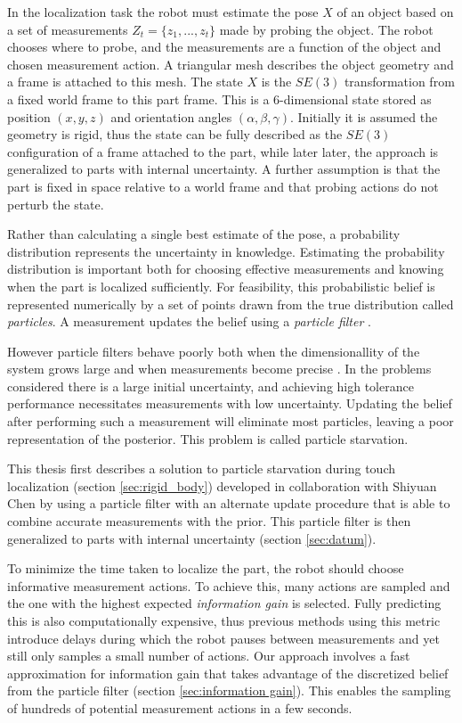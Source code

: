\documentclass[../thesis.tex]{subfiles}
\begin{document}
In the localization task the robot must estimate the pose $X$ of an object based on a set of measurements $Z_t = \{z_1, ..., z_t\}$ made by probing the object.
The robot chooses where to probe, and the measurements are a function of the object and chosen measurement action.
A triangular mesh describes the object geometry and a frame is attached to this mesh. 
The state $X$ is the $SE(3)$ transformation from a fixed world frame to this part frame. 
This is a 6-dimensional state stored as position $(x,y,z)$ and orientation angles $(\alpha, \beta, \gamma)$. 
Initially it is assumed the geometry is rigid, thus the state can be fully described as the $SE(3)$ configuration of a frame attached to the part, while later later, the approach is generalized to parts with internal uncertainty.
A further assumption is that the part is fixed in space relative to a world frame and that probing actions do not perturb the state. 

Rather than calculating a single best estimate of the pose, a probability distribution represents the uncertainty in knowledge.
Estimating the probability distribution is important both for choosing effective measurements and knowing when the part is localized sufficiently. 
For feasibility, this probabilistic belief is represented numerically by a set of points drawn from the true distribution called \textit{particles}. 
A measurement updates the belief using a \textit{particle filter} \cite{Thrun2000a}.

However particle filters behave poorly both when the dimensionallity of the system grows large and when measurements become precise \cite{Koval2013}. 
In the problems considered there is a large initial uncertainty, and achieving high tolerance performance necessitates measurements with low uncertainty.
Updating the belief after performing such a measurement will eliminate most particles, leaving a poor representation of the posterior. This problem is called particle starvation.

This thesis first describes a solution to particle starvation during touch localization (section \ref{sec:rigid_body}) developed in collaboration with Shiyuan Chen \cite{Saund2017} by using a particle filter with an alternate update procedure that is able to combine accurate measurements with the prior. 
This particle filter is then generalized to parts with internal uncertainty (section \ref{sec:datum}).

To minimize the time taken to localize the part, the robot should choose informative measurement actions.
To achieve this, many actions are sampled and the one with the highest expected \textit{information gain} is selected. 
Fully predicting this is also computationally expensive, thus previous methods using this metric introduce delays during which the robot pauses between measurements and yet still only samples a small number of actions.
Our approach involves a fast approximation for information gain that takes advantage of the discretized belief from the particle filter (section \ref{sec:information gain}). 
This enables the sampling of hundreds of potential measurement actions in a few seconds. 
\end{document}
